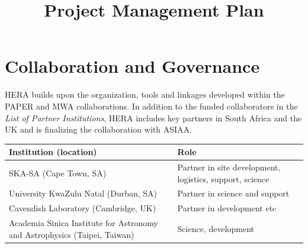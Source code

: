 \documentclass[preprint]{aastex}
\begin{document}
\title{Project Management Plan}


\section{Collaboration and Governance}
HERA builds upon the organization, tools and linkages developed within the PAPER and MWA collaborations.
In addition to the funded collaborators in the {\em List of Partner Institutions},
HERA includes key partners in South Africa and the UK and is finalizing the collaboration with ASIAA.
\begin{table}[h]
\begin{tabular}{| p{} | p{} |}\hline
\textbf{Institution (location)} & \textbf{Role} \\ \hline
SKA-SA (Cape Town, SA) & Partner in site development, logistics, support, science \\ \hline
University KwaZulu Natal (Durban, SA) & Partner in science and support \\ \hline
Cavendish Laboratory (Cambridge, UK) & Partner in development etc \\ \hline
Academia Sinica Institute for Astronomy and Astrophysics (Taipei, Taiwan) & Science, development \\ \hline
\end{tabular}
\label{tab:otherpartners}
\end{table}
\end{document}
